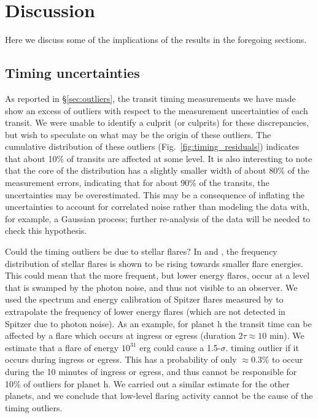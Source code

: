 \documentclass[twocolumn]{aastex63}
\begin{document}
\section{Discussion} \label{sec:discussion}

Here we discuss some of the implications of the results in the foregoing sections.

\subsection{Timing uncertainties}

As reported in \S \ref{sec:outliers}, the transit timing measurements we have made show an excess of outliers with respect to the measurement uncertainties of each transit.  We were unable to identify a culprit (or culprits) for these discrepancies, but wish to speculate on what may be the origin of these outliers.  The cumulative distribution of these outliers (Fig.\ \ref{fig:timing_residuals}) indicates that about 10\% of transits
are affected at some level.  It is also interesting to note that the core of the distribution has a slightly smaller width of about 80\% of the measurement errors, indicating that for about 90\% of the transits, the uncertainties may be overestimated.  This may be a consequence of inflating the uncertainties to account for correlated noise rather than modeling the data with, for example, a Gaussian process;  further re-analysis of the data will be needed to check this hypothesis.

Could the timing outliers be due to stellar flares?  In \citet{Vida_2017} and \citet{Ducrot2020}, the frequency distribution of stellar flares is shown to be rising towards smaller flare energies.  This could mean that the more frequent, but lower energy flares, occur at a level that is swamped by the photon noise, and thus not visible to an observer.  We used the spectrum and energy calibration of Spitzer flares measured by \citet{Ducrot2020} to extrapolate the frequency of lower energy flares (which are not detected in Spitzer due to photon noise).  As an example, for planet h the transit time can be affected by a flare which occurs at ingress or egress (duration $2\tau \approx 10$ min).  %
We estimate that a flare of energy $10^{31}$ erg could cause a 1.5-$\sigma$.
timing outlier if it occurs during ingress or egress.  This has a probability of only $\approx 0.3$\% to occur during the 10 minutes of ingress or egress,
and thus cannot be responsible for 10\% of outliers for planet h.  We carried out a similar estimate for
the other planets, and we conclude that low-level flaring activity cannot be the cause of the timing outliers.
\end{document}
